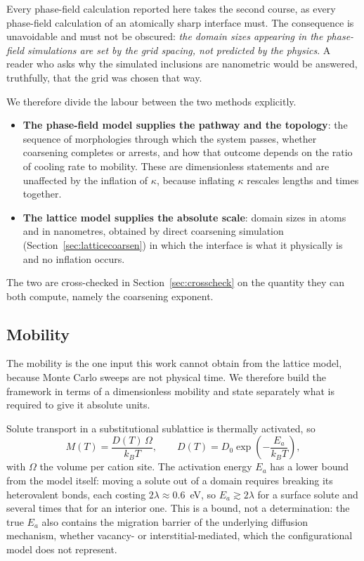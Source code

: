 \documentclass[11pt,a4paper]{article}
\begin{document}
Every phase-field calculation reported here takes the second course, as every
phase-field calculation of an atomically sharp interface must. The consequence
is unavoidable and must not be obscured: \emph{the domain sizes appearing in the
phase-field simulations are set by the grid spacing, not predicted by the
physics}. A reader who asks why the simulated inclusions are nanometric would be
answered, truthfully, that the grid was chosen that way.

We therefore divide the labour between the two methods explicitly.

\begin{itemize}\itemsep2pt
\item \textbf{The phase-field model supplies the pathway and the topology}: the
sequence of morphologies through which the system passes, whether coarsening
completes or arrests, and how that outcome depends on the ratio of cooling rate
to mobility. These are dimensionless statements and are unaffected by the
inflation of $\kappa$, because inflating $\kappa$ rescales lengths and times
together.
\item \textbf{The lattice model supplies the absolute scale}: domain sizes in
atoms and in nanometres, obtained by direct coarsening simulation
(Section~\ref{sec:latticecoarsen}) in which the interface is what it physically
is and no inflation occurs.
\end{itemize}

The two are cross-checked in Section~\ref{sec:crosscheck} on the quantity they
can both compute, namely the coarsening exponent.

\subsection{Mobility}
\label{sec:mobility}

The mobility is the one input this work cannot obtain from the lattice model,
because Monte Carlo sweeps are not physical time. We therefore build the
framework in terms of a dimensionless mobility and state separately what is
required to give it absolute units.

Solute transport in a substitutional sublattice is thermally activated, so
\begin{equation}
M(T) = \frac{D(T)\, \Omega}{k_B T}, \qquad
D(T) = D_0 \exp\!\left(-\frac{E_a}{k_B T}\right),
\label{eq:arrhenius}
\end{equation}
with $\Omega$ the volume per cation site. The activation energy $E_a$ has a
lower bound from the model itself: moving a solute out of a domain requires
breaking its heterovalent bonds, each costing $2\lambda \approx 0.6$~eV, so
$E_a \gtrsim 2\lambda$ for a surface solute and several times that for an
interior one. This is a bound, not a determination: the true $E_a$ also contains
the migration barrier of the underlying diffusion mechanism, whether vacancy- or
interstitial-mediated, which the configurational model does not represent.
\end{document}

